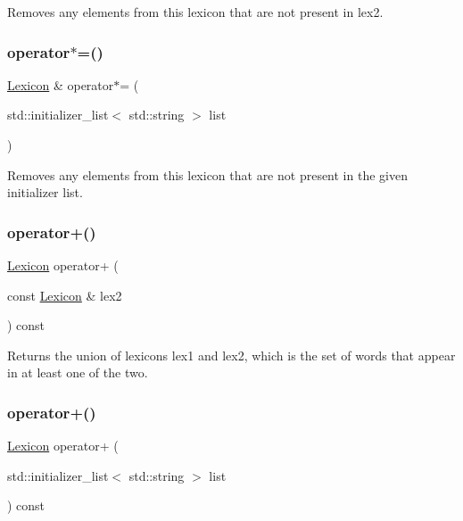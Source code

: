 Removes any elements from this lexicon that are not present in {\ttfamily lex2}. 

\mbox{\label{classLexicon_a79ada3cb64d9f074114ce895c67be781}} 
\subsubsection{\texorpdfstring{operator$\ast$=()}{operator*=()}\hspace{0.1cm}{\footnotesize\ttfamily [2/2]}}
{\footnotesize\ttfamily \mbox{\hyperlink{classLexicon}{Lexicon}} \& operator$\ast$= (\begin{DoxyParamCaption}\item[{std\+::initializer\+\_\+list$<$ std\+::string $>$}]{list }\end{DoxyParamCaption})}



Removes any elements from this lexicon that are not present in the given initializer list. 

\mbox{\label{classLexicon_acfc41a903b549304f3b70e48fd2e52e4}} 
\subsubsection{\texorpdfstring{operator+()}{operator+()}\hspace{0.1cm}{\footnotesize\ttfamily [1/3]}}
{\footnotesize\ttfamily \mbox{\hyperlink{classLexicon}{Lexicon}} operator+ (\begin{DoxyParamCaption}\item[{const \mbox{\hyperlink{classLexicon}{Lexicon}} \&}]{lex2 }\end{DoxyParamCaption}) const}



Returns the union of lexicons {\ttfamily lex1} and {\ttfamily lex2}, which is the set of words that appear in at least one of the two. 

\mbox{\label{classLexicon_a4436a915b6de75438364ed061e0e9491}} 
\subsubsection{\texorpdfstring{operator+()}{operator+()}\hspace{0.1cm}{\footnotesize\ttfamily [2/3]}}
{\footnotesize\ttfamily \mbox{\hyperlink{classLexicon}{Lexicon}} operator+ (\begin{DoxyParamCaption}\item[{std\+::initializer\+\_\+list$<$ std\+::string $>$}]{list }\end{DoxyParamCaption}) const}



